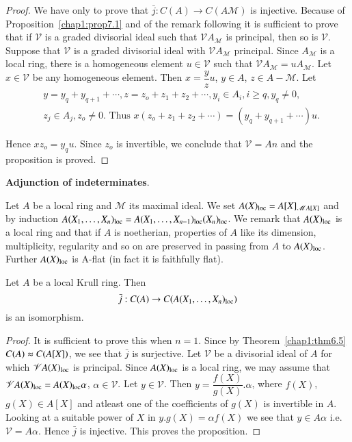 \begin{proof}
We have only to prove that $\bar{j} : C(A) \rightarrow C(A
\mathscr{M})$ is injective. 
 Because of Proposition~\ref{chap1:prop7.1} and of the remark following it is
 sufficient to prove that if $\mathscr{V}$ is a graded divisorial
 ideal such that $\mathscr{V} A_{\mathscr{M}}$ is principal, then so
 is $\mathscr{V}$. Suppose that $\mathscr{V}$ is a graded divisorial
 ideal with $\mathscr{V} A_{\mathscr{M}}$ principal. Since
 $A_{\mathscr{M}}$ is a local ring, there is a homogeneous element $u
 \in \mathscr{V}$ such that $\mathscr{V} A_{\mathscr{M}} = u
 A_{\mathscr{M}}$. Let $x \in \mathscr{V}$ be any homogeneous
 element. Then $x = \dfrac{y}{z} u$, $y \in A$, $z \in A -
 \mathscr{M}$. Let   
\begin{align*}
& y = y_q + y_{q+1} + \cdots, z = z_o + z_1 + z_2 + \cdots , y_i \in
    A_i, i \ge q, y_q \neq 0,\\ 
& z_j \in A_j, z_o \neq 0. \text{ Thus } x(z_o + z_1 +  z_2 + \cdots )
    = (y_q + y_{q+1} + \cdots ) u. 
\end{align*}\pageoriginale  
  
  \noindent
  Hence $xz_o = y_q u$. Since $z_o$ is invertible, we conclude that
  $\mathscr{V} = An$ and the proposition is proved.  
  \end{proof}


\medskip  
\noindent
\textbf{Adjunction of indeterminates}.

  Let $A$ be a local ring and $\mathscr{M}$ its maximal ideal. We set
  $A(X)_{\operatorname{loc}} = A [X]_{\mathscr{M} A [X]}$ and by induction $A(X_1,
  \ldots , X_n)_{\loc} = A(X_1, \ldots , X_{n-1})_{\loc}\break
  (X_n)_{\loc}$. We remark that $A(X)_{\operatorname{loc}}$ is a local ring and that
  if $A$ is noetherian, properties of $A$ like its dimension,
  multiplicity, regularity and so on are preserved in passing from $A$
  to $A(X)_{\operatorname{loc}}$. Further $A(X)_{\operatorname{loc}}$ is A-flat (in fact it is
  faithfully flat). 
  
\begin{prop}\label{chap1:prop7.5}%
Let $A$ be a local Krull ring. Then 
$$\bar{j} : C(A) \rightarrow
  C(A(X_1, \ldots , X_n)_{\operatorname{loc}})$$ 
is an isomorphism. 
\end{prop}  
  
\begin{proof}
It is sufficient to prove this when $n = 1$. Since by 
Theorem~\ref{chap1:thm6.5} 
$C(A) \thickapprox C(A [X])$, we see that $\bar{j}$ is surjective. Let
$\mathscr{V}$ be a divisorial ideal of $A$ for which $\mathscr{V}
A(X)_{\operatorname{loc}}$ is principal. Since $A(X)_{\operatorname{loc}}$ is a local ring, we
may assume that $\mathscr{V} A(X)_{\operatorname{loc}} = A(X)_{\operatorname{loc}} \alpha$, $\alpha
\in \mathscr{V}$. Let $y \in \mathscr{V}$. Then $y =
\dfrac{f(X)}{g(X)}. \alpha$, where $f(X)$, $g(X) \in A[ X]$ and atleast
one of the coefficients of $g(X)$ is invertible in $A$. Looking at a
suitable power of $X$ in $y.g(X)= \alpha f(X)$ we see that $y \in A
\alpha $ i.e. $\mathscr{V} = A \alpha$. Hence $\bar{j}$ is
injective. This proves the proposition. 
\end{proof}  
  
